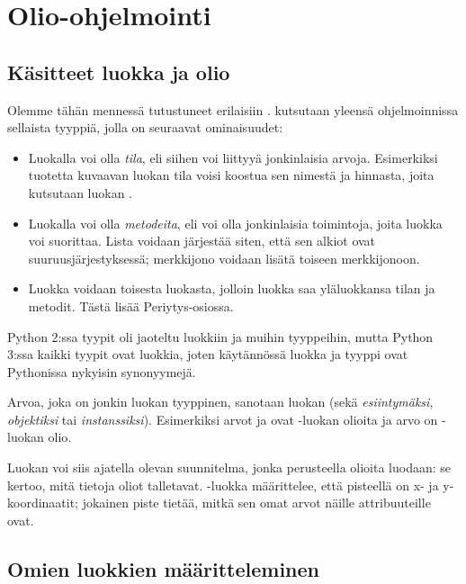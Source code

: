 \chapter{Olio-ohjelmointi}

\section{Käsitteet luokka ja olio}

Olemme tähän mennessä tutustuneet erilaisiin .  kutsutaan yleensä ohjelmoinnissa sellaista tyyppiä, jolla on seuraavat ominaisuudet:

\begin{itemize}
\item Luokalla voi olla \textit{tila}, eli siihen voi liittyyä jonkinlaisia arvoja. Esimerkiksi tuotetta kuvaavan luokan tila voisi koostua sen nimestä ja hinnasta, joita kutsutaan luokan .
\item Luokalla voi olla \textit{metodeita}, eli voi olla jonkinlaisia toimintoja, joita luokka voi suorittaa. Lista voidaan järjestää siten, että sen alkiot ovat suuruusjärjestyksessä; merkkijono voidaan lisätä toiseen merkkijonoon.
\item Luokka voidaan  toisesta luokasta, jolloin luokka saa yläluokkansa tilan ja metodit. Tästä lisää Periytys-osiossa.
\end{itemize}

Python 2:ssa tyypit oli jaoteltu luokkiin ja muihin tyyppeihin, mutta Python 3:ssa kaikki tyypit ovat luokkia, joten käytännössä luokka ja tyyppi ovat Pythonissa nykyisin synonyymejä.

Arvoa, joka on jonkin luokan tyyppinen, sanotaan luokan  (sekä \textit{esiintymäksi}, \textit{objektiksi} tai \textit{instanssiksi}). Esimerkiksi arvot  ja  ovat -luokan olioita ja arvo  on -luokan olio.

Luokan voi siis ajatella olevan suunnitelma, jonka perusteella olioita luodaan: se kertoo, mitä tietoja oliot talletavat. -luokka määrittelee, että pisteellä on x- ja y-koordinaatit; jokainen piste tietää, mitkä sen omat arvot näille attribuuteille ovat.

\section{Omien luokkien määritteleminen}

